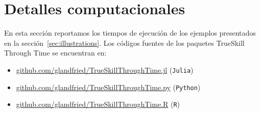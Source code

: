 \documentclass[a4paper,11pt]{book}
\theoremstyle{definition}
\begin{document}
\section{Detalles computacionales}\label{sec:computationDetails}
%
En esta sección reportamos los tiempos de ejecución de los ejemplos presentados en la sección~\ref{sec:illustrations}.
%
Los códigos fuentes de los paquetes TrueSkill Through Time se encuentran en:
\begin{itemize}
\item \href{github.com/glandfried/TrueSkillThroughTime.jl}{\url{github.com/glandfried/TrueSkillThroughTime.jl}} (\texttt{Julia})
\item \href{github.com/glandfried/TrueSkillThroughTime.py}{\url{github.com/glandfried/TrueSkillThroughTime.py}}  (\texttt{Python})
\item \href{github.com/glandfried/TrueSkillThroughTime.R}{\url{github.com/glandfried/TrueSkillThroughTime.R}}  (\texttt{R})
\end{itemize}

\end{document}
